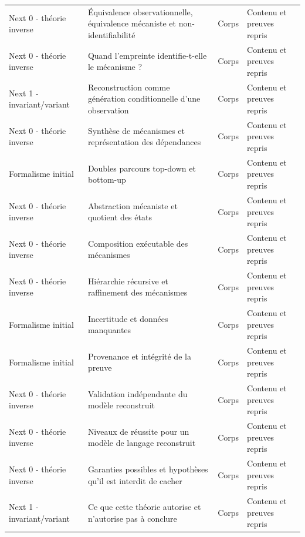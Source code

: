 \documentclass[11pt,oneside]{book}
\theoremstyle{definition}
\theoremstyle{remark}
\newcommand{\1}{\mathbf 1}
\begin{document}
\begin{longtable}{>{\raggedright\arraybackslash}p{} >{\raggedright\arraybackslash}p{} >{\raggedright\arraybackslash}p{} >{\raggedright\arraybackslash}p{}}
Next 0 - théorie inverse & Équivalence observationnelle, équivalence mécaniste et non-identifiabilité & Corps & Contenu et preuves repris \\

Next 0 - théorie inverse & Quand l'empreinte identifie-t-elle le mécanisme ? & Corps & Contenu et preuves repris \\

Next 1 - invariant/variant & Reconstruction comme génération conditionnelle d'une observation & Corps & Contenu et preuves repris \\

Next 0 - théorie inverse & Synthèse de mécanismes et représentation des dépendances & Corps & Contenu et preuves repris \\

Formalisme initial & Doubles parcours top-down et bottom-up & Corps & Contenu et preuves repris \\

Next 0 - théorie inverse & Abstraction mécaniste et quotient des états & Corps & Contenu et preuves repris \\

Next 0 - théorie inverse & Composition exécutable des mécanismes & Corps & Contenu et preuves repris \\

Next 0 - théorie inverse & Hiérarchie récursive et raffinement des mécanismes & Corps & Contenu et preuves repris \\

Formalisme initial & Incertitude et données manquantes & Corps & Contenu et preuves repris \\

Formalisme initial & Provenance et intégrité de la preuve & Corps & Contenu et preuves repris \\

Next 0 - théorie inverse & Validation indépendante du modèle reconstruit & Corps & Contenu et preuves repris \\

Next 0 - théorie inverse & Niveaux de réussite pour un modèle de langage reconstruit & Corps & Contenu et preuves repris \\

Next 0 - théorie inverse & Garanties possibles et hypothèses qu'il est interdit de cacher & Corps & Contenu et preuves repris \\

Next 1 - invariant/variant & Ce que cette théorie autorise et n'autorise pas à conclure & Corps & Contenu et preuves repris \\


\end{longtable}
\end{document}
